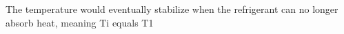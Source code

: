 The temperature would eventually stabilize when the refrigerant can no longer absorb heat, meaning Ti equals T1